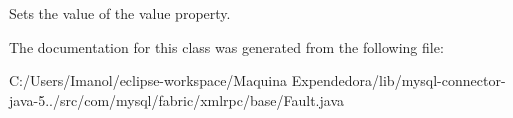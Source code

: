 Sets the value of the value property. 

The documentation for this class was generated from the following file\+:\begin{DoxyCompactItemize}
\item 
C\+:/\+Users/\+Imanol/eclipse-\/workspace/\+Maquina Expendedora/lib/mysql-\/connector-\/java-\/5../src/com/mysql/fabric/xmlrpc/base/Fault.\+java\end{DoxyCompactItemize}
